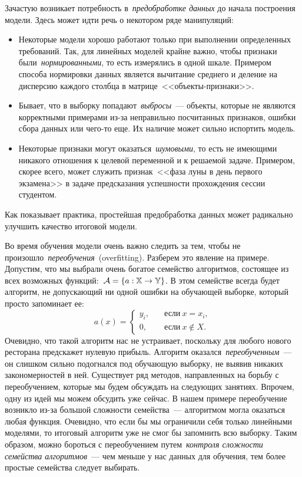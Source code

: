 \documentclass[12pt,fleqn]{article}
\begin{document}
Зачастую возникает потребность в~\emph{предобработке данных} до начала построения модели.
Здесь может идти речь о некотором ряде манипуляций:
\begin{itemize}
    \item Некоторые модели хорошо работают только при выполнении определенных требований.
        Так, для линейных моделей крайне важно, чтобы признаки были~\emph{нормированными},
        то есть измерялись в одной шкале.
        Примером способа нормировки данных является вычитание среднего и деление на дисперсию каждого столбца
        в матрице~<<объекты-признаки>>.
    \item Бывает, что в выборку попадают~\emph{выбросы}~--- объекты, которые не являются корректными примерами
        из-за неправильно посчитанных признаков, ошибки сбора данных или чего-то еще.
        Их наличие может сильно испортить модель.
    \item Некоторые признаки могут оказаться~\emph{шумовыми}, то есть не имеющими никакого отношения
        к целевой переменной и к решаемой задаче.
        Примером, скорее всего, может служить признак~<<фаза луны в день первого экзамена>> в задаче предсказания
        успешности прохождения сессии студентом.
\end{itemize}
Как показывает практика, простейшая предобработка данных может радикально улучшить качество
итоговой модели.

Во время обучения модели очень важно следить за тем, чтобы
не произошло~\emph{переобучения}~(overfitting).
Разберем это явление на примере.
Допустим, что мы выбрали очень богатое семейство алгоритмов,
состоящее из всех возможных функций:~$\mathcal{A} = \{a: \mathbb{X} \to \mathbb{Y}\}$.
В этом семействе всегда будет алгоритм, не допускающий ни одной
ошибки на обучающей выборке, который просто запоминает ее:
\[
    a(x)
    =
    \begin{cases}
        y_i, &\quad \text{если}\ x = x_i,\\
        0, &\quad \text{если}\ x \notin X.
    \end{cases}
\]
Очевидно, что такой алгоритм нас не устраивает, поскольку для любого нового ресторана
предскажет нулевую прибыль.
Алгоритм оказался~\emph{переобученным}~--- он слишком сильно подогнался
под обучающую выборку, не выявив никаких закономерностей в ней.
Существует ряд методов, направленных на борьбу с переобучением, которые мы
будем обсуждать на следующих занятиях.
Впрочем, одну из идей мы можем обсудить уже сейчас.
В нашем примере переобучение возникло из-за большой сложности
семейства~--- алгоритмом могла оказаться любая функция.
Очевидно, что если бы мы ограничили себя только линейными моделями,
то итоговый алгоритм уже не смог бы запомнить всю выборку.
Таким образом, можно бороться с переобучением путем~\emph{контроля сложности
семейства алгоритмов}~--- чем меньше у нас данных для обучения,
тем более простые семейства следует выбирать.
\end{document}
